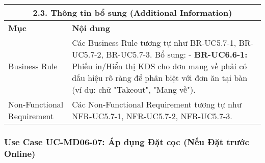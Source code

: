 \begin{longtable}{|m{4cm}|p{11cm}|}
\hline
\multicolumn{2}{|c|}{\textbf{2.3. Thông tin bổ sung (Additional Information)}} \\
\hline
\textbf{Mục} & \textbf{Nội dung} \\
\hline
Business Rule & Các Business Rule tương tự như BR-UC5.7-1, BR-UC5.7-2, BR-UC5.7-3. Bổ sung: \newline - \textbf{BR-UC6.6-1:} Phiếu in/Hiển thị KDS cho đơn mang về phải có dấu hiệu rõ ràng để phân biệt với đơn ăn tại bàn (ví dụ: chữ "Takeout", "Mang về"). \\
\hline
Non-Functional Requirement & Các Non-Functional Requirement tương tự như NFR-UC5.7-1, NFR-UC5.7-2, NFR-UC5.7-3. \\
\hline
\end{longtable}

\subsubsection{Use Case UC-MD06-07: Áp dụng Đặt cọc (Nếu Đặt trước Online)}

